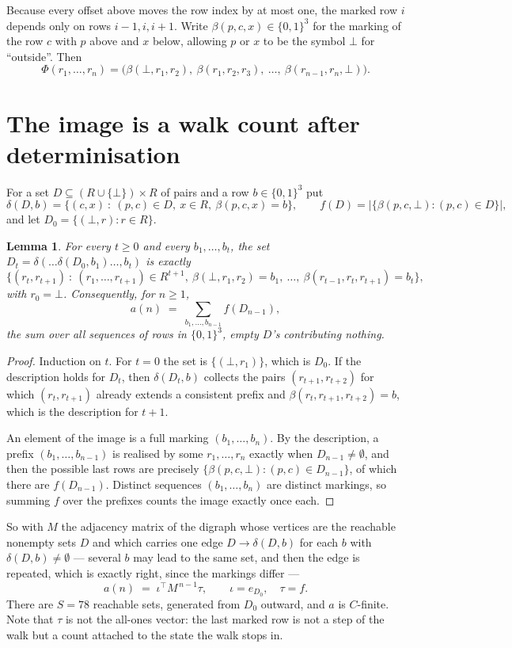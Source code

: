 \documentclass[11pt,a4paper]{article}
\theoremstyle{plain}
\newtheorem{lemma}[theorem]{Lemma}
\theoremstyle{definition}
\begin{document}
Because every offset above moves the row index by at most one, the marked row $i$ depends only
on rows $i-1,i,i+1$. Write $\beta(p,c,x)\in\{0,1\}^{3}$ for the marking of the row $c$
with $p$ above and $x$ below, allowing $p$ or $x$ to be the symbol $\bot$ for ``outside''.
Then
\[
\Phi(r_1,\dots,r_n)=\bigl(\beta(\bot,r_1,r_2),\ \beta(r_1,r_2,r_3),\ \dots,\
\beta(r_{n-1},r_n,\bot)\bigr).
\]

\section{The image is a walk count after determinisation}

For a set $D\subseteq(R\cup\{\bot\})\times R$ of pairs and a row $b\in\{0,1\}^{3}$ put
\[
\delta(D,b)=\{(c,x)\ :\ (p,c)\in D,\ x\in R,\ \beta(p,c,x)=b\},\qquad
f(D)=\bigl|\{\beta(p,c,\bot):(p,c)\in D\}\bigr| ,
\]
and let $D_0=\{(\bot,r):r\in R\}$.

\begin{lemma}\label{lem:det}
For every $t\ge0$ and every $b_1,\dots,b_t$, the set
$D_t=\delta(\dots\delta(D_0,b_1)\dots,b_t)$ is exactly
\[
\{(r_t,r_{t+1})\ :\ (r_1,\dots,r_{t+1})\in R^{t+1},\ \beta(\bot,r_1,r_2)=b_1,\ \dots,\
\beta(r_{t-1},r_t,r_{t+1})=b_t\} ,
\]
with $r_0=\bot$. Consequently, for $n\ge1$,
\[
a(n)\;=\;\sum_{b_1,\dots,b_{n-1}}f(D_{n-1}),
\]
the sum over all sequences of rows in $\{0,1\}^{3}$, empty $D$'s contributing nothing.
\end{lemma}

\begin{proof}
Induction on $t$. For $t=0$ the set is $\{(\bot,r_1)\}$, which is $D_0$. If the description
holds for $D_t$, then $\delta(D_t,b)$ collects the pairs $(r_{t+1},r_{t+2})$ for which
$(r_t,r_{t+1})$ already extends a consistent prefix and
$\beta(r_t,r_{t+1},r_{t+2})=b$, which is the description for $t+1$.

An element of the image is a full marking $(b_1,\dots,b_n)$. By the description, a prefix
$(b_1,\dots,b_{n-1})$ is realised by some $r_1,\dots,r_n$ exactly when $D_{n-1}\neq
\emptyset$, and then the possible last rows are precisely
$\{\beta(p,c,\bot):(p,c)\in D_{n-1}\}$, of which there are $f(D_{n-1})$. Distinct
sequences $(b_1,\dots,b_n)$ are distinct markings, so summing $f$ over the prefixes counts the
image exactly once each.
\end{proof}

So with $M$ the adjacency matrix of the digraph whose vertices are the reachable nonempty sets
$D$ and which carries one edge $D\to\delta(D,b)$ for each $b$ with $\delta(D,b)\neq\emptyset$
--- several $b$ may lead to the same set, and then the edge is repeated, which is exactly
right, since the markings differ ---
\[
a(n)\;=\;\iota^{\!\top}M^{\,n-1}\tau,\qquad \iota=e_{D_0},\quad \tau=f .
\]
There are $S=78$ reachable sets, generated from $D_0$ outward, and $a$ is $C$-finite. Note
that $\tau$ is not the all-ones vector: the last marked row is not a step of the walk but a
count attached to the state the walk stops in.
\end{document}

